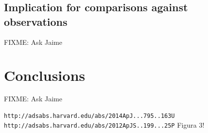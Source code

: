 \documentclass[useAMS,usenatbib]{mn2e}
\begin{document}
\subsection{Implication for comparisons against observations}
FIXME: Ask Jaime

\section{Conclusions}
\label{sec:conclusions}
FIXME: Ask Jaime




\verb"http://adsabs.harvard.edu/abs/2014ApJ...795..163U"
\verb"http://adsabs.harvard.edu/abs/2012ApJS..199...25P" Figura 3!
\end{document}
